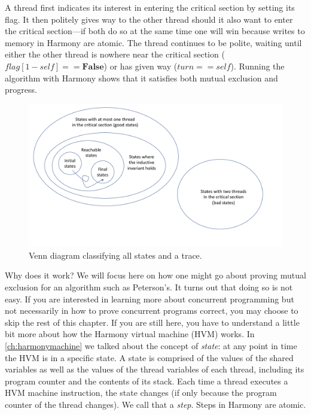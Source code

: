 \documentclass{report}
\begin{document}
A thread first indicates its interest in entering the critical section
by setting its flag.
It then politely gives way to the other thread should it also want to
enter the critical section---if both do so at the same time one will
win because writes to memory in Harmony are atomic.
The thread continues to be polite, waiting
until either the other thread is nowhere near the critical section
($\mathit{flag}[1 - \mathit{self}] == \mathbf{False}$) or has given way
($\mathit{turn} == \mathit{self}$).
Running the algorithm with Harmony shows that it satisfies both mutual
exclusion and progress.

\begin{figure}
\begin{center}
\includegraphics[width=6in]{figures/states-crop.pdf}
\end{center}
\caption{Venn diagram classifying all states and a trace.}
\label{fig:states}
\end{figure}

%
%

Why does it work?  We will focus here on how one might go about proving
mutual exclusion for an algorithm such as Peterson's.
It turns out that doing so is not easy.
If you are interested in learning more about concurrent programming
but not necessarily in how to prove concurrent programs correct, you
may choose to skip the rest of this chapter.
If you are still here, you have to understand a little bit more about
how the Harmony virtual machine (HVM) works.
In \autoref{ch:harmonymachine} we talked about the concept of \emph{state}:
%
at any point in time the HVM is in a specific state.
A state is comprised of the values of the shared variables as well as
the values of the thread variables
%
of each thread, including its
program counter and the contents of its stack.
Each time a thread executes a HVM machine instruction, the
state changes (if only because the program counter of the thread
changes).  We call that a \emph{step}.
%
Steps in Harmony are atomic.
\end{document}
